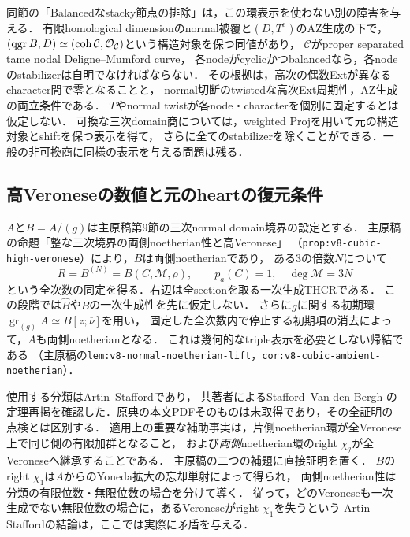 \documentclass[11pt,a4paper]{ltjsarticle}
\begin{document}
同節の「Balancedなstacky節点の排除」は，この環表示を使わない別の障害を与える．
有限homological dimensionのnormal被覆と$(D,T^e)$のAZ生成の下で，
$(\operatorname{qgr} B,D)\simeq(\operatorname{coh}\mathcal C,\mathcal O_{\mathcal C})$という構造対象を保つ同値があり，
$\mathcal C$がproper separated tame nodal Deligne--Mumford curve，
各nodeがcyclicかつbalancedなら，各nodeのstabilizerは自明でなければならない．
その根拠は，高次の偶数Extが異なるcharacter間で零となることと，
normal切断のtwistedな高次Ext周期性，AZ生成の両立条件である．
$T$やnormal twistが各node・characterを個別に固定するとは仮定しない．
可換な三次domain商については，weighted Projを用いて元の構造対象とshiftを保つ表示を得て，
さらに全てのstabilizerを除くことができる．一般の非可換商に同様の表示を与える問題は残る．

\subsection{高Veroneseの数値と元のheartの復元条件}\label{subsec:v8-high-veronese-notes}

$A$と$B=A/(g)$は主原稿第9節の三次normal domain境界の設定とする．
主原稿の命題「整な三次境界の両側noetherian性と高Veronese」
（\texttt{prop:v8-cubic-high-veronese}）により，$B$は両側noetherianであり，
ある$3$の倍数$N$について
\[
 R=B^{(N)}=B(C,\mathcal M,\rho),\qquad
 p_a(C)=1,\quad\deg\mathcal M=3N
\]
という全次数の同定を得る．右辺は全sectionを取る一次生成THCRである．
この段階では$\widehat B$や$B$の一次生成性を先に仮定しない．
さらに$g$に関する初期環$\operatorname{gr}_{(g)}A\simeq B[z;\overline\nu]$を用い，
固定した全次数内で停止する初期項の消去によって，$A$も両側noetherianとなる．
これは幾何的なtriple表示を必要としない帰結である
（主原稿の\texttt{lem:v8-normal-noetherian-lift}，\texttt{cor:v8-cubic-ambient-noetherian}）．

使用する分類はArtin--Stafford\cite[Theorems 0.1, 0.2, 0.4, 0.5]{ASquadratic}であり，
共著者によるStafford--Van den Bergh\cite[Theorems 5.1, 5.2, 5.5, 5.6, 著者版pp.~13--15]{SVdBsurvey}
の定理再掲を確認した．原典の本文PDFそのものは未取得であり，その全証明の点検とは区別する．
適用上の重要な補助事実は，片側noetherian環が全Veronese上で同じ側の有限加群となること，
および\emph{両側}noetherian環のright $\chi_j$が全Veroneseへ継承することである．
主原稿の二つの補題に直接証明を置く．
$B$のright $\chi_1$は$A$からのYoneda拡大の忘却単射によって得られ，
両側noetherian性は分類の有限位数・無限位数の場合を分けて導く．
従って，どのVeroneseも一次生成でない無限位数の場合に，あるVeroneseがright $\chi_1$を失うという
Artin--Staffordの結論は，ここでは実際に矛盾を与える．
\end{document}

